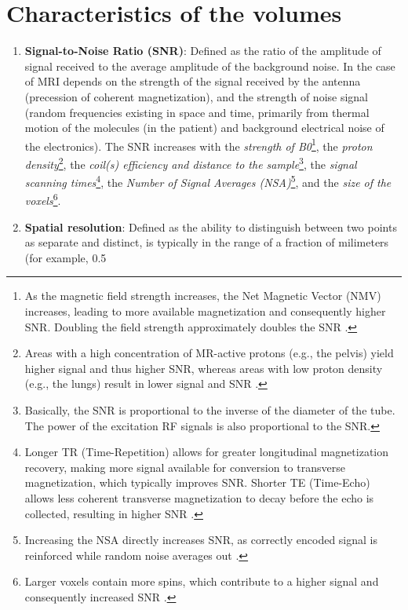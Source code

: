 \section{Characteristics of the volumes}
\begin{enumerate}
\item \textbf{Signal-to-Noise Ratio (SNR)}: Defined as the ratio of
  the amplitude of signal received to the average amplitude of the
  background noise. In the case of MRI depends on the strength of the
  signal received by the antenna (precession of coherent
  magnetization), and the strength of noise signal (random frequencies
  existing in space and time, primarily from thermal motion of the
  molecules (in the patient) and background electrical noise of the
  electronics). The SNR increases with the \emph{strength of
    B0}\footnote{As the magnetic field strength increases, the Net
    Magnetic Vector (NMV) increases, leading to more available
    magnetization and consequently higher SNR. Doubling the field
    strength approximately doubles the SNR \cite{westbrook2018mri}.},
  the \emph{proton density}\footnote{Areas with a high concentration
    of MR-active protons (e.g., the pelvis) yield higher signal and
    thus higher SNR, whereas areas with low proton density (e.g., the
    lungs) result in lower signal and SNR \cite{westbrook2018mri}.},
  the \emph{coil(s) efficiency and distance to the
    sample}\footnote{Basically, the SNR is proportional to the inverse
    of the diameter of the tube. The power of the excitation RF
    signals is also proportional to the SNR.}, the \emph{signal
    scanning times}\footnote{Longer TR (Time-Repetition) allows for
    greater longitudinal magnetization recovery, making more signal
    available for conversion to transverse magnetization, which
    typically improves SNR. Shorter TE (Time-Echo) allows less
    coherent transverse magnetization to decay before the echo is
    collected, resulting in higher SNR \cite{westbrook2018mri}.}, the
  \emph{Number of Signal Averages (NSA)}\footnote{Increasing the NSA
    directly increases SNR, as correctly encoded signal is reinforced
    while random noise averages out \cite{westbrook2018mri}.}, and the
  \emph{size of the voxels}\footnote{Larger voxels contain more spins,
    which contribute to a higher signal and consequently increased SNR
    \cite{westbrook2018mri}.}.
\item \textbf{Spatial resolution}: Defined as the ability to
  distinguish between two points as separate and distinct, is
  typically in the range of a fraction of milimeters (for example, 0.5

\end{enumerate}
